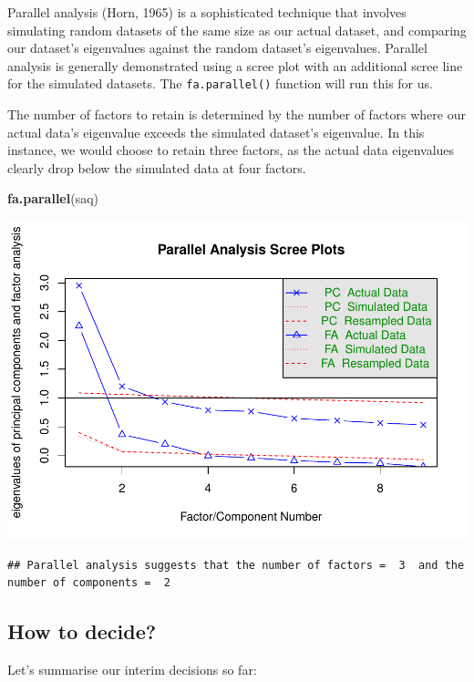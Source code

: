 \documentclass[
]{book}
\newenvironment{Shaded}{\begin{snugshade}}{\end{snugshade}}
\newcommand{\FunctionTok}[1]{\textcolor[rgb]{0.13,0.29,0.53}{\textbf{#1}}}
\newcommand{\NormalTok}[1]{#1}
\begin{document}
Parallel analysis (Horn, 1965) is a sophisticated technique that involves simulating random datasets of the same size as our actual dataset, and comparing our dataset's eigenvalues against the random dataset's eigenvalues. Parallel analysis is generally demonstrated using a scree plot with an additional scree line for the simulated datasets. The \texttt{fa.parallel()} function will run this for us.

The number of factors to retain is determined by the number of factors where our actual data's eigenvalue exceeds the simulated dataset's eigenvalue. In this instance, we would choose to retain three factors, as the actual data eigenvalues clearly drop below the simulated data at four factors.

\begin{Shaded}
\begin{Highlighting}[]
\FunctionTok{fa.parallel}\NormalTok{(saq)}
\end{Highlighting}
\end{Shaded}

\includegraphics{_main_files/figure-latex/unnamed-chunk-334-1.pdf}

\begin{verbatim}
## Parallel analysis suggests that the number of factors =  3  and the number of components =  2
\end{verbatim}

\subsection{How to decide?}\label{how-to-decide}

Let's summarise our interim decisions so far:
\end{document}
